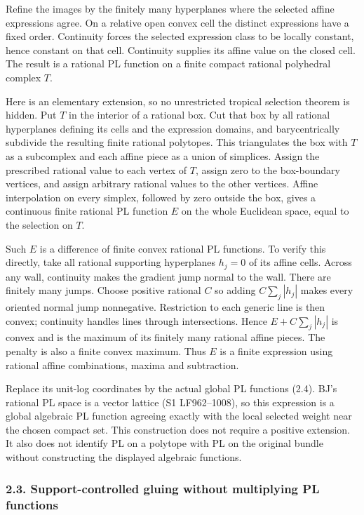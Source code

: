 \documentclass[
  10pt,
]{article}
\begin{document}
Refine the images by the finitely many hyperplanes where the selected
affine expressions agree. On a relative open convex cell the distinct
expressions have a fixed order. Continuity forces the selected
expression class to be locally constant, hence constant on that cell.
Continuity supplies its affine value on the closed cell. The result is a
rational PL function on a finite compact rational polyhedral complex
\(T\).

Here is an elementary extension, so no unrestricted tropical selection
theorem is hidden. Put \(T\) in the interior of a rational box. Cut that
box by all rational hyperplanes defining its cells and the expression
domains, and barycentrically subdivide the resulting finite rational
polytopes. This triangulates the box with \(T\) as a subcomplex and each
affine piece as a union of simplices. Assign the prescribed rational
value to each vertex of \(T\), assign zero to the box-boundary vertices,
and assign arbitrary rational values to the other vertices. Affine
interpolation on every simplex, followed by zero outside the box, gives
a continuous finite rational PL function \(E\) on the whole Euclidean
space, equal to the selection on \(T\).

Such \(E\) is a difference of finite convex rational PL functions. To
verify this directly, take all rational supporting hyperplanes \(h_j=0\)
of its affine cells. Across any wall, continuity makes the gradient jump
normal to the wall. There are finitely many jumps. Choose positive
rational \(C\) so adding \(C\sum_j|h_j|\) makes every oriented normal
jump nonnegative. Restriction to each generic line is then convex;
continuity handles lines through intersections. Hence \(E+C\sum_j|h_j|\)
is convex and is the maximum of its finitely many rational affine
pieces. The penalty is also a finite convex maximum. Thus \(E\) is a
finite expression using rational affine combinations, maxima and
subtraction.

Replace its unit-log coordinates by the actual global PL functions
(2.4). BJ's rational PL space is a vector lattice (S1 LF962--1008), so
this expression is a global algebraic PL function agreeing exactly with
the local selected weight near the chosen compact set. This construction
does not require a positive extension. It also does not identify PL on a
polytope with PL on the original bundle without constructing the
displayed algebraic functions.

\subsubsection{2.3. Support-controlled gluing without multiplying PL
functions}\label{support-controlled-gluing-without-multiplying-pl-functions}
\end{document}
